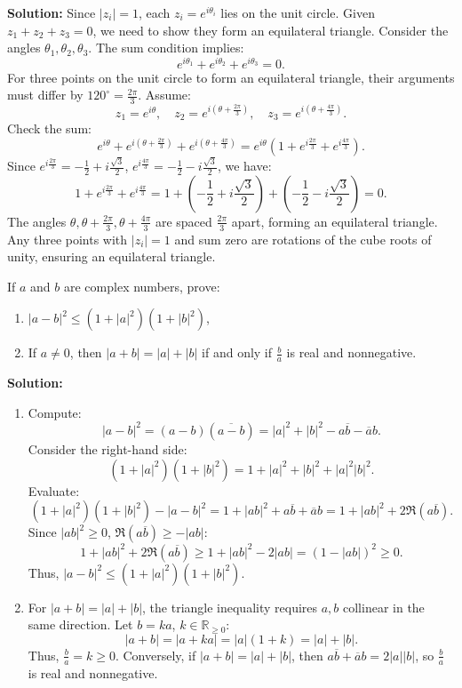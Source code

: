 \textbf{Solution:}
Since \( |z_i| = 1 \), each \( z_i = e^{i\theta_i} \) lies on the unit circle. Given \( z_1 + z_2 + z_3 = 0 \), we need to show they form an equilateral triangle. Consider the angles \( \theta_1, \theta_2, \theta_3 \). The sum condition implies:
\[
e^{i\theta_1} + e^{i\theta_2} + e^{i\theta_3} = 0.
\]
For three points on the unit circle to form an equilateral triangle, their arguments must differ by \( 120^\circ = \frac{2\pi}{3} \). Assume:
\[
z_1 = e^{i\theta}, \quad z_2 = e^{i(\theta + \frac{2\pi}{3})}, \quad z_3 = e^{i(\theta + \frac{4\pi}{3})}.
\]
Check the sum:
\[
e^{i\theta} + e^{i(\theta + \frac{2\pi}{3})} + e^{i(\theta + \frac{4\pi}{3})} = e^{i\theta} \left( 1 + e^{i\frac{2\pi}{3}} + e^{i\frac{4\pi}{3}} \right).
\]
Since \( e^{i\frac{2\pi}{3}} = -\frac{1}{2} + i\frac{\sqrt{3}}{2} \), \( e^{i\frac{4\pi}{3}} = -\frac{1}{2} - i\frac{\sqrt{3}}{2} \), we have:
\[
1 + e^{i\frac{2\pi}{3}} + e^{i\frac{4\pi}{3}} = 1 + \left(-\frac{1}{2} + i\frac{\sqrt{3}}{2}\right) + \left(-\frac{1}{2} - i\frac{\sqrt{3}}{2}\right) = 0.
\]
The angles \( \theta, \theta + \frac{2\pi}{3}, \theta + \frac{4\pi}{3} \) are spaced \( \frac{2\pi}{3} \) apart, forming an equilateral triangle. Any three points with \( |z_i| = 1 \) and sum zero are rotations of the cube roots of unity, ensuring an equilateral triangle.

\begin{problembox}
If \( a \) and \( b \) are complex numbers, prove:
\begin{enumerate}[label=\alph*)]
\item \( |a - b|^2 \leq (1 + |a|^2)(1 + |b|^2) \),
\item If \( a \neq 0 \), then \( |a + b| = |a| + |b| \) if and only if \( \frac{b}{a} \) is real and nonnegative.
\end{enumerate}
\end{problembox}

\textbf{Solution:}
\begin{enumerate}[label=\alph*)]
\item Compute:
\[
|a - b|^2 = (a - b)(\overline{a - b}) = |a|^2 + |b|^2 - a\overline{b} - \overline{a}b.
\]
Consider the right-hand side:
\[
(1 + |a|^2)(1 + |b|^2) = 1 + |a|^2 + |b|^2 + |a|^2 |b|^2.
\]
Evaluate:
\[
(1 + |a|^2)(1 + |b|^2) - |a - b|^2 = 1 + |a b|^2 + a\overline{b} + \overline{a}b = 1 + |a b|^2 + 2\Re(a\overline{b}).
\]
Since \( |a b|^2 \geq 0 \), \( \Re(a\overline{b}) \geq -|a b| \):
\[
1 + |a b|^2 + 2\Re(a\overline{b}) \geq 1 + |a b|^2 - 2|a b| = (1 - |a b|)^2 \geq 0.
\]
Thus, \( |a - b|^2 \leq (1 + |a|^2)(1 + |b|^2) \).
\item For \( |a + b| = |a| + |b| \), the triangle inequality requires \( a, b \) collinear in the same direction. Let \( b = ka \), \( k \in \mathbb{R}_{\geq 0} \):
\[
|a + b| = |a + ka| = |a|(1 + k) = |a| + |b|.
\]
Thus, \( \frac{b}{a} = k \geq 0 \). Conversely, if \( |a + b| = |a| + |b| \), then \( a\overline{b} + \overline{a}b = 2|a||b| \), so \( \frac{b}{a} \) is real and nonnegative.
\end{enumerate}

